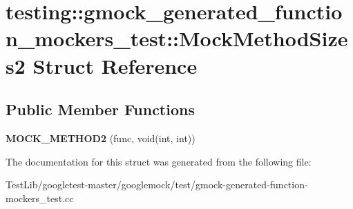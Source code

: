 \hypertarget{structtesting_1_1gmock__generated__function__mockers__test_1_1MockMethodSizes2}{}\section{testing\+:\+:gmock\+\_\+generated\+\_\+function\+\_\+mockers\+\_\+test\+:\+:Mock\+Method\+Sizes2 Struct Reference}
\label{structtesting_1_1gmock__generated__function__mockers__test_1_1MockMethodSizes2}
\subsection*{Public Member Functions}
\begin{DoxyCompactItemize}
\item 
\mbox{\label{structtesting_1_1gmock__generated__function__mockers__test_1_1MockMethodSizes2_a9200d3c0d5cbabb2bb93da4827b84260}} 
{\bfseries M\+O\+C\+K\+\_\+\+M\+E\+T\+H\+O\+D2} (func, void(int, int))
\end{DoxyCompactItemize}


The documentation for this struct was generated from the following file\+:\begin{DoxyCompactItemize}
\item 
Test\+Lib/googletest-\/master/googlemock/test/gmock-\/generated-\/function-\/mockers\+\_\+test.\+cc\end{DoxyCompactItemize}
